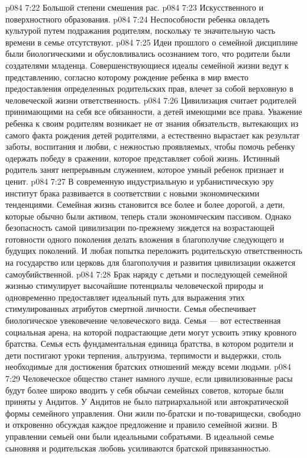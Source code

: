 \vs p084 7:22 \bibnobreakspace Большой степени смешения рас.
\vs p084 7:23 \bibnobreakspace Искусственного и поверхностного образования.
\vs p084 7:24 \bibnobreakspace Неспособности ребенка овладеть культурой путем подражания родителям, поскольку те значительную часть времени в семье отсутствуют.
\vs p084 7:25 \pc Идеи прошлого о семейной дисциплине были биологическими и обусловливались осознанием того, что родители были создателями младенца. Совершенствующиеся идеалы семейной жизни ведут к представлению, согласно которому рождение ребенка в мир вместо предоставления определенных родительских прав, влечет за собой верховную в человеческой жизни ответственность.
\vs p084 7:26 Цивилизация считает родителей принимающими на себя все обязанности, а детей имеющими все права. Уважение ребенка к своим родителям возникает не от знания обязательств, вытекающих из самого факта рождения детей родителями, а естественно вырастает как результат заботы, воспитания и любви, с нежностью проявляемых, чтобы помочь ребенку одержать победу в сражении, которое представляет собой жизнь. Истинный родитель занят непрерывным служением, которое умный ребенок признает и ценит.
\vs p084 7:27 \pc В современную индустриальную и урбанистическую эру институт брака развивается в соответствии с новыми экономическими тенденциями. Семейная жизнь становится все более и более дорогой, а дети, которые обычно были активом, теперь стали экономическим пассивом. Однако безопасность самой цивилизации по\hyp{}прежнему зиждется на возрастающей готовности одного поколения делать вложения в благополучие следующего и будущих поколений. И любая попытка переложить родительскую ответственность на государство или церковь для благополучия и развития цивилизации окажется самоубийственной.
\vs p084 7:28 \pc Брак наряду с детьми и последующей семейной жизнью стимулирует высочайшие потенциалы человеческой природы и одновременно предоставляет идеальный путь для выражения этих стимулированных атрибутов смертной личности. Семья обеспечивает биологическое увековечение человеческого вида. Семья --- вот естественная социальная арена, на которой подрастающие дети могут усвоить этику кровного братства. Семья есть фундаментальная единица братства, в котором родители и дети постигают уроки терпения, альтруизма, терпимости и выдержки, столь необходимые для достижения братских отношений между всеми людьми.
\vs p084 7:29 Человеческое общество станет намного лучше, если цивилизованные расы будут более широко вводить у себя обычаи семейных советов, которые были приняты у Андитов. У Андитов не было патриархальной или автократической формы семейного управления. Они жили по\hyp{}братски и по\hyp{}товарищески, свободно и откровенно обсуждая каждое предложение и правило семейной жизни. В управлении семьей они были идеальными собратьями. В идеальной семье сыновняя и родительская любовь усиливаются братской привязанностью.
